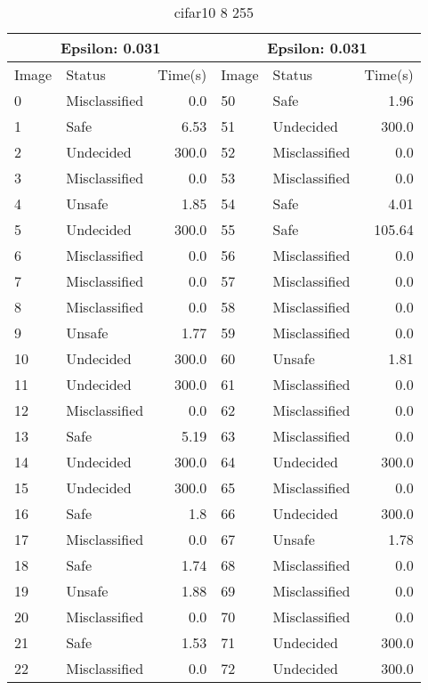 \begin{table}[!ht]
  \centering
  \caption{cifar10 8 255}
  \footnotesize
  \begin{tabular}{|llr|llr|}
    \toprule
    \multicolumn{3}{|c|}{Epsilon: 0.031} & \multicolumn{3}{|c|}{Epsilon: 0.031} \\
    \midrule
    Image & Status & Time(s) &Image & Status & Time(s)\\ 
    \midrule
    0 & Misclassified & 0.0 &    50 & Safe & 1.96\\ 
    1 & Safe & 6.53 &    51 & Undecided & 300.0\\ 
    2 & Undecided & 300.0 &    52 & Misclassified & 0.0\\ 
    3 & Misclassified & 0.0 &    53 & Misclassified & 0.0\\ 
    4 & Unsafe & 1.85 &    54 & Safe & 4.01\\ 
    5 & Undecided & 300.0 &    55 & Safe & 105.64\\ 
    6 & Misclassified & 0.0 &    56 & Misclassified & 0.0\\ 
    7 & Misclassified & 0.0 &    57 & Misclassified & 0.0\\ 
    8 & Misclassified & 0.0 &    58 & Misclassified & 0.0\\ 
    9 & Unsafe & 1.77 &    59 & Misclassified & 0.0\\ 
    10 & Undecided & 300.0 &    60 & Unsafe & 1.81\\ 
    11 & Undecided & 300.0 &    61 & Misclassified & 0.0\\ 
    12 & Misclassified & 0.0 &    62 & Misclassified & 0.0\\ 
    13 & Safe & 5.19 &    63 & Misclassified & 0.0\\ 
    14 & Undecided & 300.0 &    64 & Undecided & 300.0\\ 
    15 & Undecided & 300.0 &    65 & Misclassified & 0.0\\ 
    16 & Safe & 1.8 &    66 & Undecided & 300.0\\ 
    17 & Misclassified & 0.0 &    67 & Unsafe & 1.78\\ 
    18 & Safe & 1.74 &    68 & Misclassified & 0.0\\ 
    19 & Unsafe & 1.88 &    69 & Misclassified & 0.0\\ 
    20 & Misclassified & 0.0 &    70 & Misclassified & 0.0\\ 
    21 & Safe & 1.53 &    71 & Undecided & 300.0\\ 
    22 & Misclassified & 0.0 &    72 & Undecided & 300.0\\ 

\end{tabular}
\end{table}
